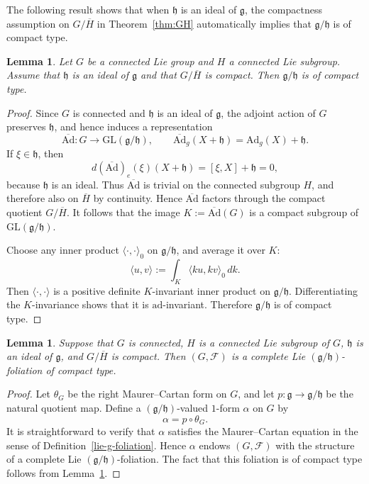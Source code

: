 \documentclass[reqno, 11pt]{amsart}
\newtheorem{lem}[thm]{Lemma}
\theoremstyle{definition}
\theoremstyle{property}
\theoremstyle{remark}
\numberwithin{equation}{section}
\begin{document}
The following result shows that when $\mathfrak h$ is an ideal of
$\mathfrak g$, the compactness assumption on $G/\overline{H}$ in
Theorem~\ref{thm:GH} automatically implies that $\mathfrak g/\mathfrak h$ is of
compact type.

\begin{lem}\label{relationship}
Let $G$ be a connected Lie group and $H$ a connected Lie subgroup. Assume that
$\mathfrak h$ is an ideal of $\mathfrak g$ and that $G/\overline{H}$ is compact.
Then $\mathfrak g/\mathfrak h$ is of compact type.
\end{lem}

\begin{proof}
Since $G$ is connected and $\mathfrak h$ is an ideal of $\mathfrak g$, the
adjoint action of $G$ preserves $\mathfrak h$, and hence induces a
representation
\[
\overline{\mathrm{Ad}}:G\to \mathrm{GL}(\mathfrak g/\mathfrak h),\qquad
\overline{\mathrm{Ad}}_g(X+\mathfrak h)=\mathrm{Ad}_g(X)+\mathfrak h.
\]
If $\xi\in \mathfrak h$, then
\[
d(\overline{\mathrm{Ad}})_e(\xi)(X+\mathfrak h)=[\xi,X]+\mathfrak h=0,
\]
because $\mathfrak h$ is an ideal. Thus $\overline{\mathrm{Ad}}$ is trivial on the
connected subgroup $H$, and therefore also on $\overline{H}$ by continuity.
Hence $\overline{\mathrm{Ad}}$ factors through the compact quotient
$G/\overline{H}$. It follows that the image
$K:=\overline{\mathrm{Ad}}(G)$ is a compact subgroup of
$\mathrm{GL}(\mathfrak g/\mathfrak h)$.

Choose any inner product $\langle \cdot,\cdot\rangle_0$ on
$\mathfrak g/\mathfrak h$, and average it over $K$:
\[
\langle u,v\rangle:=\int_K \langle ku,kv\rangle_0\,dk.
\]
Then $\langle \cdot,\cdot\rangle$ is a positive definite $K$-invariant inner
product on $\mathfrak g/\mathfrak h$. Differentiating the $K$-invariance shows
that it is $\mathrm{ad}$-invariant. Therefore $\mathfrak g/\mathfrak h$ is of
compact type.
\end{proof}

\begin{lem}\label{isometry}
Suppose that $G$ is connected, $H$ is a connected Lie subgroup of $G$, $\mathfrak h$ is an ideal of $\mathfrak g$, and $G/\overline{H}$ is compact. Then $(G,\mathcal F)$ is a complete Lie $(\mathfrak g/\mathfrak h)$-foliation of compact type.
\end{lem}

\begin{proof}
Let $\theta_G$ be the right Maurer--Cartan form on $G$, and let
$p:\mathfrak g\to \mathfrak g/\mathfrak h$ be the natural quotient map.
Define a $(\mathfrak g/\mathfrak h)$-valued $1$-form $\alpha$ on $G$ by
\[
\alpha = p\circ \theta_G.
\]
It is straightforward to verify that $\alpha$ satisfies the Maurer--Cartan equation in the sense of Definition~\ref{lie-g-foliation}. Hence $\alpha$ endows $(G,\mathcal F)$ with the structure of a complete Lie $(\mathfrak g/\mathfrak h)$-foliation. The fact that this foliation is of compact type follows from Lemma~\ref{relationship}.
\end{proof}
\end{document}
